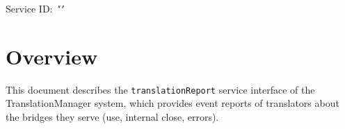 \documentclass[a4paper]{arrowhead}
\begin{document}
\sloppy

\ArrowheadSetup

\begin{center}
  \vspace*{1cm}
  \huge{\arrowtitle}

  \vspace*{0.2cm}
  \LARGE{\arrowtype}
  \vspace*{1cm}

  \Large{Service ID: \textit{"\arrowid"}}

  \vspace*{\fill}


  \vspace*{1cm}
  \vspace*{\fill}

  \begin{abstract}
    This document describes the HTTP/1.1 protocol with TLS payload security and JSON payload encoding variant of the \texttt{translationReport} service of the TranslationManager system.
  \end{abstract}

  \vspace*{1cm}
\end{center}

\newpage

\tableofcontents
\newpage

\section{Overview}
\label{sec:overview}

This document describes the \texttt{translationReport} service interface of the TranslationManager system, which provides event reports of translators about the bridges they serve (use, internal close, errors).
\end{document}
